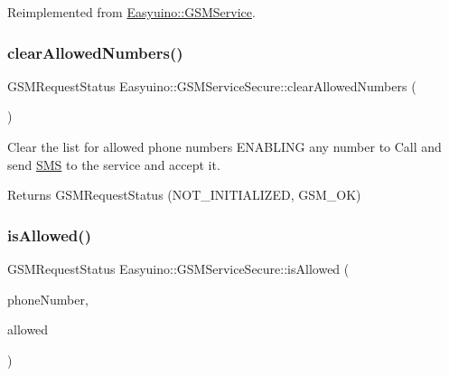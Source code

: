 Reimplemented from \hyperlink{class_easyuino_1_1_g_s_m_service_a02c2bddace1c87f035f324ae248c4f1d}{Easyuino\+::\+G\+S\+M\+Service}.

\mbox{\label{class_easyuino_1_1_g_s_m_service_secure_a10a8160dfb473d84b4bd182d689bdb95}} 
\subsubsection{\texorpdfstring{clear\+Allowed\+Numbers()}{clearAllowedNumbers()}}
{\footnotesize\ttfamily G\+S\+M\+Request\+Status Easyuino\+::\+G\+S\+M\+Service\+Secure\+::clear\+Allowed\+Numbers (\begin{DoxyParamCaption}{ }\end{DoxyParamCaption})}



Clear the list for allowed phone numbers E\+N\+A\+B\+L\+I\+NG any number to Call and send \hyperlink{class_easyuino_1_1_s_m_s}{S\+MS} to the service and accept it. 

\begin{DoxyReturn}{Returns}
G\+S\+M\+Request\+Status (N\+O\+T\+\_\+\+I\+N\+I\+T\+I\+A\+L\+I\+Z\+ED, G\+S\+M\+\_\+\+OK) 
\end{DoxyReturn}
\mbox{\label{class_easyuino_1_1_g_s_m_service_secure_a791dd872fe2c72311d84219616e5f54c}} 
\subsubsection{\texorpdfstring{is\+Allowed()}{isAllowed()}}
{\footnotesize\ttfamily G\+S\+M\+Request\+Status Easyuino\+::\+G\+S\+M\+Service\+Secure\+::is\+Allowed (\begin{DoxyParamCaption}\item[{IN unsigned long}]{phone\+Number,  }\item[{O\+UT bool \&}]{allowed }\end{DoxyParamCaption})}



